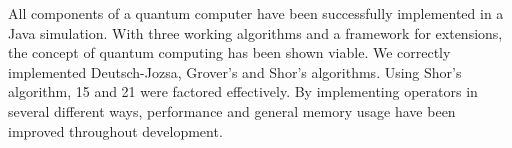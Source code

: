 All components of a quantum computer have been successfully implemented in a Java simulation. With three working algorithms and a framework for extensions, the concept of quantum computing has been shown viable. We correctly implemented Deutsch-Jozsa, Grover's and Shor's algorithms. Using Shor's algorithm, 15 and 21 were factored effectively. By implementing operators in several different ways, performance and general memory usage have been improved throughout development.